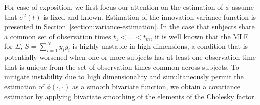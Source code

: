 \documentclass[12pt]{article}
\theoremstyle{definition}
\begin{document}
%
%
 





For ease of exposition, we first focus our attention on the estimation of $\phi$ assume that $\sigma^2\left(t\right)$ is fixed and known. Estimation of the innovation variance function is presented in Section~\ref{section:variance-estimation}. In the case that subjects share a common set of observation times $t_1 < \dots < t_m$,  it is well known that the MLE for $\Sigma$, $S = \sum_{i=1}^N y_i y_i^\prime$ is highly unstable in high dimensions, a condition that is potentially worsened when one or more subjects has at least one observation time that is unique from the set of observation times common across subjects. To mitigate instability due to high dimensionality and simultaneously permit the estimation of $\phi\left(\cdot,\cdot\right)$ as a smooth bivariate function, we obtain a covariance estimator by applying bivariate smoothing of the elements of the Cholesky factor. 
\end{document}
